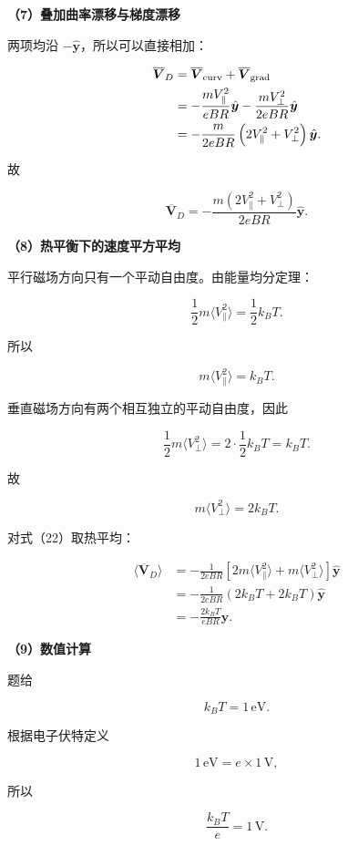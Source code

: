 \documentclass[12pt,a4paper,UTF8]{ctexart}
\begin{document}
\textbf{（7）叠加曲率漂移与梯度漂移}

两项均沿 \(-\hat{\boldsymbol y}\)，所以可以直接相加：

\[
\begin{aligned}
\overline{\boldsymbol V}_{D}
&=\overline{\boldsymbol V}_{\rm curv}
+\overline{\boldsymbol V}_{\rm grad}\\
&=-\frac{mV_{\parallel}^2}{eBR}\hat{\boldsymbol y}
-\frac{mV_\perp^2}{2eBR}\hat{\boldsymbol y}\\
&=-\frac{m}{2eBR}
\left(2V_{\parallel}^2+V_\perp^2\right)
\hat{\boldsymbol y}.
\end{aligned}
\]

故

\[
\boxed{
\overline{\boldsymbol V}_{D}
=-\frac{m(2V_{\parallel}^2+V_\perp^2)}{2eBR}
\hat{\boldsymbol y}
}.
\tag{22}
\]

\textbf{（8）热平衡下的速度平方平均}

平行磁场方向只有一个平动自由度。由能量均分定理：

\[
\frac12m\langle V_{\parallel}^2\rangle
=\frac12k_BT.
\tag{23}
\]

所以

\[
m\langle V_{\parallel}^2\rangle=k_BT.
\tag{24}
\]

垂直磁场方向有两个相互独立的平动自由度，因此

\[
\frac12m\langle V_\perp^2\rangle
=2\cdot\frac12k_BT
=k_BT.
\tag{25}
\]

故

\[
m\langle V_\perp^2\rangle=2k_BT.
\tag{26}
\]

对式（22）取热平均：

\[
\begin{aligned}
\langle\overline{\boldsymbol V}_D\rangle
&=-\frac{1}{2eBR}
\left[
2m\langle V_{\parallel}^2\rangle
+m\langle V_\perp^2\rangle
\right]\hat{\boldsymbol y}\\
&=-\frac{1}{2eBR}
\left(2k_BT+2k_BT\right)
\hat{\boldsymbol y}\\
&=\boxed{
-\frac{2k_BT}{eBR}
\hat{\boldsymbol y}
}.
\end{aligned}
\tag{27}
\]

\textbf{（9）数值计算}

题给

\[
k_BT=1\,\mathrm{eV}.
\]

根据电子伏特定义

\[
1\,\mathrm{eV}=e\times1\,\mathrm V,
\]

所以

\[
\frac{k_BT}{e}=1\,\mathrm V.
\tag{28}
\]
\end{document}
